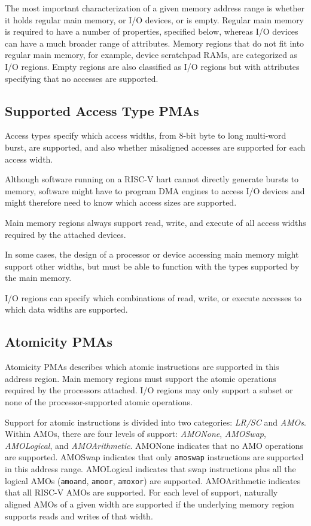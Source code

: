 The most important characterization of a given memory address range is
whether it holds regular main memory, or I/O devices, or is empty.
Regular main memory is required to have a number of properties,
specified below, whereas I/O devices can have a much broader range of
attributes.  Memory regions that do not fit into regular main
memory, for example, device scratchpad RAMs, are categorized as I/O
regions.  Empty regions are also classified as I/O regions but with
attributes specifying that no accesses are supported.

\subsection{Supported Access Type PMAs}

Access types specify which access widths, from 8-bit byte to long
multi-word burst, are supported, and also whether misaligned accesses
are supported for each access width.

\begin{commentary}
Although software running on a RISC-V hart cannot directly generate
bursts to memory, software might have to program DMA engines to access
I/O devices and might therefore need to know which access sizes are
supported.
\end{commentary}

Main memory regions always support read, write, and execute of all
access widths required by the attached devices.

\begin{commentary}
In some cases, the design of a processor or device accessing main
memory might support other widths, but must be able to function with
the types supported by the main memory.
\end{commentary}

I/O regions can specify which combinations of read, write, or execute
accesses to which data widths are supported.

\subsection{Atomicity PMAs}

Atomicity PMAs describes which atomic instructions are supported in
this address region.  Main memory regions must support the atomic
operations required by the processors attached.  I/O regions may only
support a subset or none of the processor-supported atomic operations.

Support for atomic instructions is divided into two categories: {\em
  LR/SC} and {\em AMOs}. Within AMOs, there are four levels of
support: {\em AMONone}, {\em AMOSwap}, {\em AMOLogical}, and {\em
  AMOArithmetic}.  AMONone indicates that no AMO operations are
supported.  AMOSwap indicates that only {\tt amoswap} instructions are
supported in this address range.  AMOLogical indicates that swap
instructions plus all the logical AMOs ({\tt amoand}, {\tt amoor},
{\tt amoxor}) are supported.  AMOArithmetic indicates that all RISC-V
AMOs are supported.  For each level of support, naturally aligned AMOs
of a given width are supported if the underlying memory region
supports reads and writes of that width.

